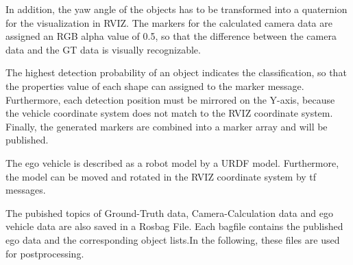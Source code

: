 In addition, the yaw angle of the objects has to be transformed into a quaternion for the visualization in RVIZ. The markers for the calculated camera data are assigned an RGB alpha value of 0.5, so that the difference between the camera data and the GT data is visually recognizable. 


The highest detection probability of an object indicates the classification, so that the properties value of each shape can assigned to the marker message. Furthermore, each detection position must be mirrored on the Y-axis, because the vehicle coordinate system does not match to the RVIZ coordinate system. Finally, the generated markers are combined into a marker array and will be published.

The ego vehicle is described as a robot model by a URDF model.
Furthermore, the model can be moved and rotated in the RVIZ coordinate system by tf messages. 

The pubished topics of Ground-Truth data, Camera-Calculation data and ego vehicle data are also saved in a Rosbag File. Each bagfile contains the published ego data and the corresponding object lists.In the following, these files are used for postprocessing.


